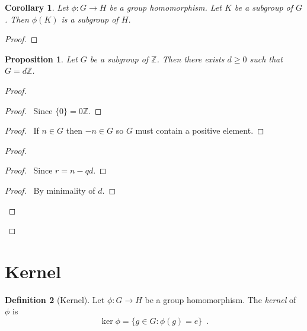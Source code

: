 \documentclass{book}
\let\qed\relax
\newtheorem{prop}{Proposition}[chapter]
\newtheorem{cor}{Corollary}[prop]
\theoremstyle{definition}
\newtheorem{df}[prop]{Definition}
\newcommand{\inv}[1]{\ensuremath{{#1}^{-1}}}
\begin{document}
\begin{cor}
Let $\phi : G \rightarrow H$ be a group homomorphism. Let $K$ be a subgroup of $G$. Then $\phi(K)$ is a subgroup of $H$.
\end{cor}

\begin{proof}
\pf
{}
\step{3}{$x\inv{y} = \phi(a\inv{b})$}
\step{4}{$x\inv{y} \in \phi(K)$}
\qed
\end{proof}

\begin{prop}
\label{prop:subgroups-of-Z}
Let $G$ be a subgroup of $\mathbb{Z}$. Then there exists $d \geq 0$ such that $G = d \mathbb{Z}$.
\end{prop}

\begin{proof}
\pf
{}
\begin{proof}
\pf\ Since $\{0\} = 0 \mathbb{Z}$.
\end{proof}
\begin{proof}
\pf\ If $n \in G$ then $-n \in G$ so $G$ must contain a positive element.
\end{proof}
\begin{proof}
	\begin{proof}
		\pf\ Since $r = n - qd$.
	\end{proof}
	\begin{proof}
		\pf\ By minimality of $d$.
	\end{proof}
\end{proof}
\qed
\end{proof}

\section{Kernel}

\begin{df}[Kernel]
Let $\phi : G \rightarrow H$ be a group homomorphism. The \emph{kernel} of $\phi$ is
\[ \ker \phi = \{ g \in G : \phi(g) = e \} \enspace . \]
\end{df}
\end{document}
